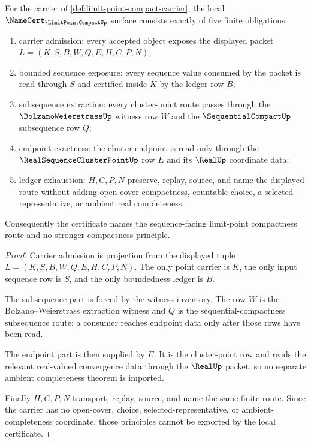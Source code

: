\begin{theorem}\label{thm:limit-point-compact-namecert-obligations}
For the carrier of \autoref{def:limit-point-compact-carrier}, the local $\NameCert_{\LimitPointCompactUp}$ surface consists exactly of five finite obligations:
\begin{enumerate}
\item carrier admission: every accepted object exposes the displayed packet $L=(K,S,B,W,Q,E,H,C,P,N)$;
\item bounded sequence exposure: every sequence value consumed by the packet is read through $S$ and certified inside $K$ by the ledger row $B$;
\item subsequence extraction: every cluster-point route passes through the $\BolzanoWeierstrassUp$ witness row $W$ and the $\SequentialCompactUp$ subsequence row $Q$;
\item endpoint exactness: the cluster endpoint is read only through the $\RealSequenceClusterPointUp$ row $E$ and its $\RealUp$ coordinate data;
\item ledger exhaustion: $H,C,P,N$ preserve, replay, source, and name the displayed route without adding open-cover compactness, countable choice, a selected representative, or ambient real completeness.
\end{enumerate}
Consequently the certificate names the sequence-facing limit-point compactness route and no stronger compactness principle.
\end{theorem}
\begin{proof}
Carrier admission is projection from the displayed tuple $L=(K,S,B,W,Q,E,H,C,P,N)$. The only point carrier is $K$, the only input sequence row is $S$, and the only boundedness ledger is $B$.

The subsequence part is forced by the witness inventory. The row $W$ is the Bolzano--Weierstrass extraction witness and $Q$ is the sequential-compactness subsequence route; a consumer reaches endpoint data only after those rows have been read.

The endpoint part is then supplied by $E$. It is the cluster-point row and reads the relevant real-valued convergence data through the $\RealUp$ packet, so no separate ambient completeness theorem is imported.

Finally $H,C,P,N$ transport, replay, source, and name the same finite route. Since the carrier has no open-cover, choice, selected-representative, or ambient-completeness coordinate, those principles cannot be exported by the local certificate.
\end{proof}

